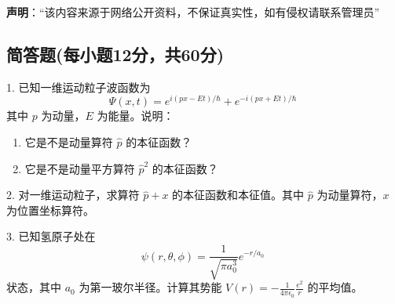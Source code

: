 
\textbf{声明}：“该内容来源于网络公开资料，不保证真实性，如有侵权请联系管理员”

\subsection{简答题(每小题12分，共60分)}
1. 已知一维运动粒子波函数为
$$ \Psi(x, t) = e^{i(px - Et)/\hbar} + e^{-i(px + Et)/\hbar}~$$ 
其中 $p$ 为动量，$E$ 为能量。说明：
\begin{enumerate}
    \item 它是不是动量算符 $\hat{p}$ 的本征函数？
    \item 它是不是动量平方算符 $\hat{p}^2$ 的本征函数？~
\end{enumerate}

2. 对一维运动粒子，求算符 $\hat{p} + x$ 的本征函数和本征值。其中 $\hat{p}$ 为动量算符，$x$ 为位置坐标算符。

3. 已知氢原子处在
$$ \psi(r, \theta, \phi) = \frac{1}{\sqrt{\pi a_0^3}} e^{-r/a_0}~$$ 
状态，其中 $a_0$ 为第一玻尔半径。计算其势能 $V(r) = -\frac{1}{4\pi \epsilon_0} \frac{e^2}{r}$ 的平均值。